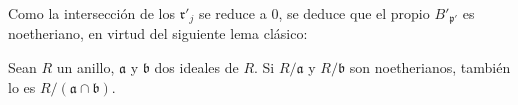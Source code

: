 Como la intersección de los $\mathfrak r'_j$ se reduce a 0, se
deduce que el propio $B'_{\mathfrak p'}$ es noetheriano, en virtud
del siguiente lema clásico:

\begin{lemma}[6.14.1.4]
\label{IV.2.s6.14.1.4-fr}
Sean $R$ un anillo, $\mathfrak a$ y $\mathfrak b$ dos ideales de
$R$. Si $R/\mathfrak a$ y $R/\mathfrak b$ son noetherianos, también
lo es $R/(\mathfrak a\cap\mathfrak b)$.
\end{lemma}


